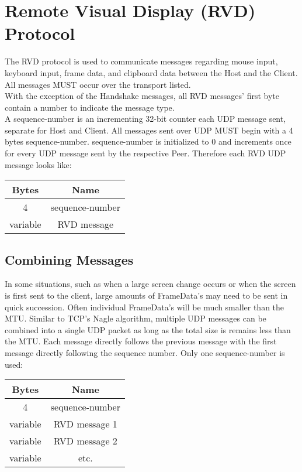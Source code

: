 \section{Remote Visual Display (RVD) Protocol}

The RVD protocol is used to communicate messages regarding mouse input, keyboard input, frame data, and clipboard
data between the
Host and the Client.\\

All messages MUST occur over the transport listed.\\

With the exception of the Handshake messages, all RVD messages' first byte contain a number to indicate
the message type. \\

A sequence-number is an incrementing 32-bit counter each UDP message sent, separate for Host and Client. All
messages sent over UDP MUST begin with a 4 bytes sequence-number. sequence-number is initialized
to 0 and increments once for every UDP message sent by the respective Peer. Therefore each RVD UDP message looks
like:

\begin{center}
    \begin{tabular}{|c|c|}
        \hline
        \textbf{Bytes} & \textbf{Name}   \\
        \hline
        4              & sequence-number \\
        \hline
        variable       & RVD message     \\
        \hline
    \end{tabular}
\end{center}

\subsection{Combining Messages}

In some situations, such as when a large screen change occurs or when the screen is first sent to the client,
large amounts of FrameData's may need to be sent in quick succession. Often individual FrameData's
will be much smaller than the MTU. Similar to TCP's Nagle algorithm, multiple UDP messages can be combined into a
single UDP packet as long as the total size is remains less than the MTU. Each message directly follows the
previous message with the first message directly following the sequence number. Only one sequence-number
is used:

\begin{center}
    \begin{tabular}{|c|c|}
        \hline
        \textbf{Bytes} & \textbf{Name}   \\
        \hline
        4              & sequence-number \\
        \hline
        variable       & RVD message 1   \\
        \hline
        variable       & RVD message 2   \\
        \hline
        variable       & etc.            \\
        \hline
    \end{tabular}
\end{center}

